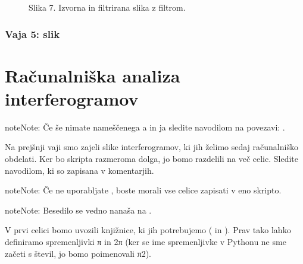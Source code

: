 \documentclass[letterpaper,10pt,english]{sphinxmanual}
\begin{document}
\begin{figure}[htbp]
\centering
\capstart

\noindent{}
\caption{Slika 7. Izvorna in filtrirana slika z  filtrom.}\label{\detokenize{uvod_py_opencv:id8}}\end{figure}


\subsection{Vaja 5:  slik}
\label{\detokenize{uvod_py_opencv:vaja-5-kopiranje-slik}}

\chapter{Računalniška analiza interferogramov}
\label{\detokenize{obdelava_interferogramov:racunalniska-analiza-interferogramov}}\label{\detokenize{obdelava_interferogramov:obdelava-interferogramov}}\label{\detokenize{obdelava_interferogramov::doc}}
\begin{sphinxadmonition}{note}{Note:}
\sphinxAtStartPar
Če še nimate nameščenega \sphinxhyphen{}a in \sphinxhyphen{}ja sledite navodilom na povezavi: .
\end{sphinxadmonition}

\sphinxAtStartPar
Na prejšnji vaji smo zajeli slike interferogramov, ki jih želimo sedaj računalniško obdelati. Ker bo skripta razmeroma dolga, jo bomo razdelili na več celic. Sledite navodilom, ki so zapisana v komentarjih.

\begin{sphinxadmonition}{note}{Note:}
\sphinxAtStartPar
Če ne uporabljate , boste morali vse celice zapisati v eno skripto.
\end{sphinxadmonition}

\begin{sphinxadmonition}{note}{Note:}
\sphinxAtStartPar
Besedilo se vedno nanaša na .
\end{sphinxadmonition}

\sphinxAtStartPar
V prvi celici bomo uvozili knjižnice, ki jih potrebujemo ( in ). Prav tako lahko definiramo spremenljivki π in 2π (ker se ime spremenljivke v Pythonu ne sme začeti s števil, jo bomo poimenovali π2).
\end{document}
